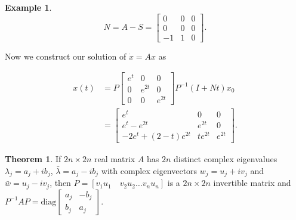 \documentclass[12pt]{article}
\theoremstyle{definition}
\newtheorem*{example}{Example}
\newtheorem{theorem}{Theorem}[section]  %
\begin{document}
\begin{example}
\[
N = A - S =
\begin{bmatrix}
0 & 0 & 0 \\
0 & 0 & 0 \\
-1 & 1 & 0
\end{bmatrix}.
\]

Now we construct our solution of $\dot x = A x$ as

\[
\begin{split}
x(t) &= P
\begin{bmatrix}
e^t & 0 & 0 \\
0 & e^{2t} & 0 \\
0 & 0 & e^{2t}
\end{bmatrix}
P^{-1} (I + Nt) x_0 \\
&=
\begin{bmatrix}
e^{t} & 0 & 0 \\
e^t - e^{2t} & e^{2t} & 0 \\
-2e^t + (2 - t)e^{2t} & te^{2t} & e^{2t}
\end{bmatrix}.
\end{split}
\]
\end{example}

\begin{theorem}
If $2n \times 2n$ real matrix $A$ has $2n$ distinct complex eigenvalues $\lambda_j = a_j + ib_j$,
$\bar \lambda = a_j - ib_j$ with complex eigenvectors $w_j = u_j + iv_j$ and $\bar w = u_j - iv_j$,
then $P = [v_1 u_1 \quad v_2 u_2 \ldots v_n u_n]$ is a $2n \times 2n$ invertible matrix and
$P^{-1}AP = \text{diag}
\begin{bmatrix}
a_j & -b_j \\
b_j & a_j
\end{bmatrix}$.
\end{theorem}
\end{document}
